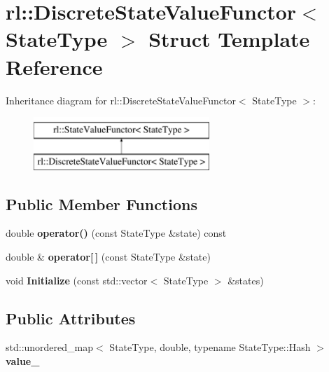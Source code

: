 \hypertarget{structrl_1_1_discrete_state_value_functor}{}\section{rl\+:\+:Discrete\+State\+Value\+Functor$<$ State\+Type $>$ Struct Template Reference}
\label{structrl_1_1_discrete_state_value_functor}
Inheritance diagram for rl\+:\+:Discrete\+State\+Value\+Functor$<$ State\+Type $>$\+:\begin{figure}[H]
\begin{center}
\leavevmode
\includegraphics[height=2.000000cm]{structrl_1_1_discrete_state_value_functor}
\end{center}
\end{figure}
\subsection*{Public Member Functions}
\begin{DoxyCompactItemize}
\item 
\hypertarget{structrl_1_1_discrete_state_value_functor_a63bf8449ed047b82326242424b8f1ef1}{}\label{structrl_1_1_discrete_state_value_functor_a63bf8449ed047b82326242424b8f1ef1} 
double {\bfseries operator()} (const State\+Type \&state) const
\item 
\hypertarget{structrl_1_1_discrete_state_value_functor_a6763e866eb6edad1a1b636dd75e15e99}{}\label{structrl_1_1_discrete_state_value_functor_a6763e866eb6edad1a1b636dd75e15e99} 
double \& {\bfseries operator\mbox{[}$\,$\mbox{]}} (const State\+Type \&state)
\item 
\hypertarget{structrl_1_1_discrete_state_value_functor_ac2c27101c79091445466bb4f3e5239c5}{}\label{structrl_1_1_discrete_state_value_functor_ac2c27101c79091445466bb4f3e5239c5} 
void {\bfseries Initialize} (const std\+::vector$<$ State\+Type $>$ \&states)
\end{DoxyCompactItemize}
\subsection*{Public Attributes}
\begin{DoxyCompactItemize}
\item 
\hypertarget{structrl_1_1_discrete_state_value_functor_a3467f778e304e14ddc44d271d41e0b6f}{}\label{structrl_1_1_discrete_state_value_functor_a3467f778e304e14ddc44d271d41e0b6f} 
std\+::unordered\+\_\+map$<$ State\+Type, double, typename State\+Type\+::\+Hash $>$ {\bfseries value\+\_\+}
\end{DoxyCompactItemize}


